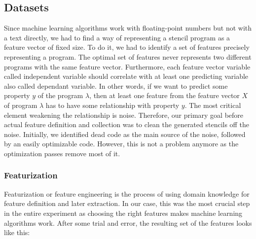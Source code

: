 \documentclass[sigplan,\review anonymous]{acmart}
\begin{document}
\subsection{Datasets}
Since machine learning algorithms work with floating-point numbers but not
with a text directly, we had to find a way of representing a stencil program
as a feature vector of fixed size. To do it, we had to identify a set of
features precisely representing a program. The optimal set of features never
represents two different programs with the same feature vector. Furthermore,
each feature vector variable called independent variable should correlate with
at least one predicting variable also called dependant variable.
In other words, if we want to predict some property $y$ of the program
$\lambda$, then at least one feature from the feature vector $X$ of program
$\lambda$ has to have some relationship with property $y$. The most critical
element weakening the relationship is noise. Therefore, our primary goal
before actual feature definition and collection was to clean the generated
stencils off the noise. Initially, we identified dead code as the main source
of the noise, followed by an easily optimizable code. However, this is not a
problem anymore as the optimization passes remove most of it.

\subsubsection{Featurization}
Featurization or feature engineering is the process of using domain knowledge
for feature definition and later extraction. In our case, this was the most
crucial step in the entire experiment as choosing the right features makes
machine learning algorithms work. After some trial and error, the resulting
set of the features looks like this:
\end{document}

